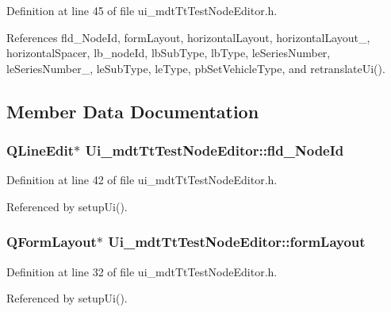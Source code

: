 Definition at line 45 of file ui\-\_\-mdt\-Tt\-Test\-Node\-Editor.\-h.



References fld\-\_\-\-Node\-Id, form\-Layout, horizontal\-Layout, horizontal\-Layout\-\_, horizontal\-Spacer, lb\-\_\-node\-Id, lb\-Sub\-Type, lb\-Type, le\-Series\-Number, le\-Series\-Number\-\_, le\-Sub\-Type, le\-Type, pb\-Set\-Vehicle\-Type, and retranslate\-Ui().



\subsection{Member Data Documentation}
\hypertarget{class_ui__mdt_tt_test_node_editor_a7e49d2c767ae5a5c3fd56870771275c3}{
\subsubsection[{fld\-\_\-\-Node\-Id}]{\setlength{\rightskip}{0pt plus 5cm}Q\-Line\-Edit$\ast$ Ui\-\_\-mdt\-Tt\-Test\-Node\-Editor\-::fld\-\_\-\-Node\-Id}}\label{class_ui__mdt_tt_test_node_editor_a7e49d2c767ae5a5c3fd56870771275c3}


Definition at line 42 of file ui\-\_\-mdt\-Tt\-Test\-Node\-Editor.\-h.



Referenced by setup\-Ui().

\hypertarget{class_ui__mdt_tt_test_node_editor_af2d8200baeae5f243ad3210730021875}{
\subsubsection[{form\-Layout}]{\setlength{\rightskip}{0pt plus 5cm}Q\-Form\-Layout$\ast$ Ui\-\_\-mdt\-Tt\-Test\-Node\-Editor\-::form\-Layout}}\label{class_ui__mdt_tt_test_node_editor_af2d8200baeae5f243ad3210730021875}


Definition at line 32 of file ui\-\_\-mdt\-Tt\-Test\-Node\-Editor.\-h.



Referenced by setup\-Ui().


